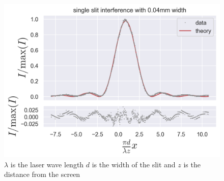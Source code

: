 \begin{figure}[H]
    \includegraphics[width=0.9\columnwidth]{figures/single slit interference with 0.04mm width.png}
    \caption{$\lambda$ is the laser wave length $d$ is the width of the slit and $z$ is the distance from the screen}
    \label{fig:single slit interference with 0.04mm width}
\end{figure}